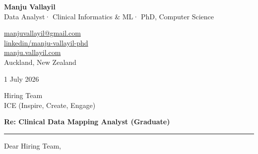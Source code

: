 \documentclass[10.5pt,a4paper]{article}
\begin{document}
\vspace*{-1.5cm}
\begin{tcolorbox}[
  enhanced, colback=accent, colframe=accent,
  arc=0pt, boxrule=0pt,
  left=1.8cm, right=1.8cm, top=16pt, bottom=14pt,
  enlarge left by=-1.8cm, enlarge right by=-1.8cm,
  width=\textwidth+3.6cm
]
  \begin{minipage}[t]{0.54\linewidth}
    {\color{white}\LARGE\bfseries Manju Vallayil}\\[5pt]
    {\color{white!65!accent}\small
      Data Analyst\enspace·\enspace
      Clinical Informatics \& ML\enspace·\enspace
      PhD, Computer Science}
  \end{minipage}%
  \hfill
  \begin{minipage}[t]{0.43\linewidth}
    \raggedleft\small\color{white!80!accent}
    \faEnvelope\enspace
      \href{mailto:manjuvallayil@gmail.com}{\textcolor{white!80!accent}{manjuvallayil@gmail.com}}\\[3pt]
    \faLinkedin\enspace
      \href{https://linkedin.com/in/manju-vallayil-phd-5b1b7a142/}{\textcolor{white!80!accent}{linkedin/manju-vallayil-phd}}\\[3pt]
    \faGlobe\enspace
      \href{https://manju.vallayil.com}{\textcolor{white!80!accent}{manju.vallayil.com}}\\[3pt]
    \faMapMarker*\enspace Auckland, New Zealand
  \end{minipage}
\end{tcolorbox}

\vspace{20pt}

{\small\color{light} 1 July 2026}

\vspace{10pt}

{\small\color{mid}
Hiring Team\\
ICE (Inspire, Create, Engage)
}

\vspace{16pt}

{\color{accent}\bfseries Re: Clinical Data Mapping Analyst (Graduate)}

{\color{accent}\rule{\linewidth}{1.5pt}}

\vspace{14pt}

Dear Hiring Team,
\end{document}
